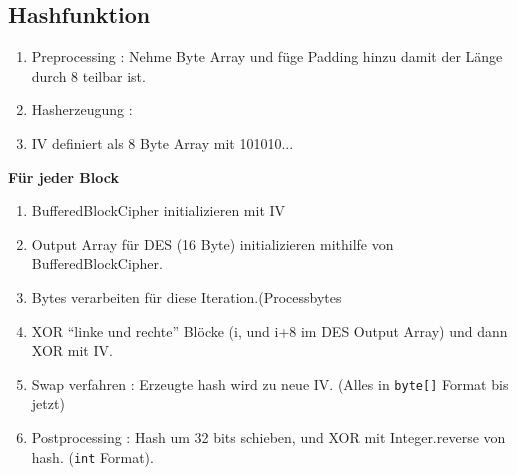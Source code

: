 \documentclass{beamer}
\begin{document}
\begin{frame}
\section{Hashfunktion}
\begin{enumerate}
 \item Preprocessing : Nehme Byte Array und füge Padding hinzu damit der Länge durch 8 teilbar ist.
 \item Hasherzeugung :
 \item IV definiert als 8 Byte Array mit 101010...
\end{enumerate}
\textbf{Für jeder Block}
\begin{enumerate}
 \item BufferedBlockCipher initializieren mit IV
 \item Output Array für DES (16 Byte) initializieren mithilfe von BufferedBlockCipher.
 \item Bytes verarbeiten für diese Iteration.(Processbytes
 \item XOR ``linke und rechte'' Blöcke (i, und i+8 im DES Output Array) und dann XOR mit IV.
 \item Swap verfahren : Erzeugte hash wird zu neue IV. (Alles in \texttt{byte[]} Format bis jetzt)
 \item Postprocessing : Hash um 32 bits schieben, und XOR mit Integer.reverse von hash. (\texttt{int} Format).
\end{enumerate}
\end{frame}
\end{document}
